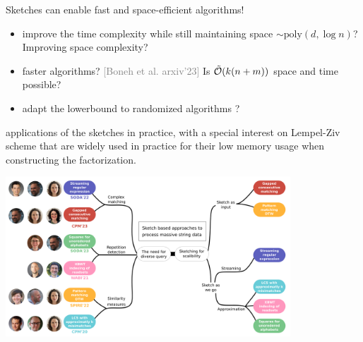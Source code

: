 \documentclass[aspectratio=169, handout]{beamer}
\begin{document}
\begin{frame}
  \begin{center}
  \end{center}
   Sketches can enable fast and space-efficient algorithms!

  \medskip
  \begin{itemize}
    \item {} improve the time complexity while still maintaining space $\sim \mathrm{poly}(d,\log n)$? Improving space complexity?
    \item {} faster algorithms? \textcolor{gray}{[Boneh et al. arxiv'23]} Is $\tilde{\mathcal{O}}(k(n+m))$ space and time possible?
    \item {} adapt the lowerbound to randomized algorithms ?
  \end{itemize}

  \medskip
   applications of the sketches in practice, with a special interest on Lempel-Ziv scheme that are widely used in practice for their low memory usage when constructing the factorization.
\end{frame}

\backupbegin
\begin{frame}
  \vfill
  \bigskip
  \begin{center}
    \includegraphics[width=0.8\textwidth]{pictures/mindmap/5.png}
  \end{center}
  \vfill
\end{frame}



\begin{frame}
  \tableofcontents
\end{frame}
\backupend
\end{document}

